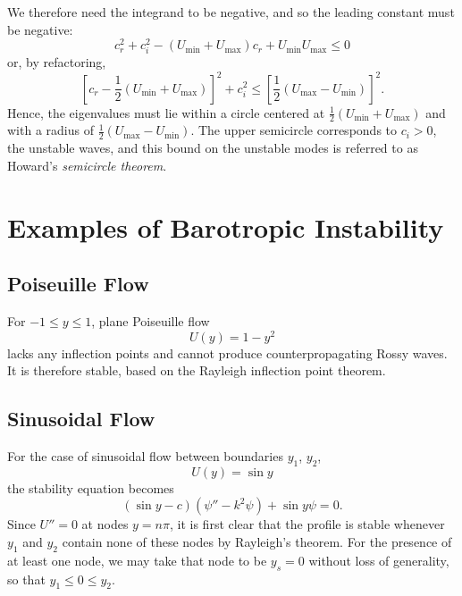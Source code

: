 \documentclass[letterpaper, 11pt, onecolumn]{article}
\begin{document}
We therefore need the integrand to be negative, and so the leading constant must be negative:
\begin{equation*}
c_r^2 + c_i^2 - (U_{\min} + U_{\max})c_r + U_{\min} U_{\max} \leq 0
\end{equation*}
or, by refactoring,
\begin{equation}
\left[c_r - \frac{1}{2}(U_{\min} + U_{\max}) \right]^2 + c_i^2 \leq \left[\frac{1}{2}(U_{\max} - U_{\min}) \right]^2.
\end{equation}
Hence, the eigenvalues must lie within a circle centered at $\frac{1}{2}(U_\text{min} + U_\text{max})$ and with a radius of $\frac{1}{2}(U_\text{max} - U_\text{min})$. The upper semicircle corresponds to $c_i > 0$, the unstable waves, and this bound on the unstable modes is referred to as Howard's \emph{semicircle theorem}.

\section{Examples of Barotropic Instability}

\subsection{Poiseuille Flow}

For $-1 \leq y \leq 1$, plane Poiseuille flow
\begin{equation*}
U(y) = 1 - y^2
\end{equation*}
lacks any inflection points and cannot produce counterpropagating Rossy waves. It is therefore stable, based on the Rayleigh inflection point theorem.

\subsection{Sinusoidal Flow}

For the case of sinusoidal flow between boundaries $y_1$, $y_2$,
\begin{equation*}
U(y) = \sin y
\end{equation*}
the stability equation becomes
\begin{equation*}
(\sin y - c) \left( \psi'' - k^2 \psi\right) + \sin y \psi = 0.
\end{equation*}
Since $U'' = 0$ at nodes $y = n \pi$, it is first clear that the profile is stable whenever $y_1$ and $y_2$ contain none of these nodes by Rayleigh's theorem. For the presence of at least one node, we may take that node to be $y_s = 0$ without loss of generality, so that $y_1 \leq 0 \leq y_2$.
\end{document}
